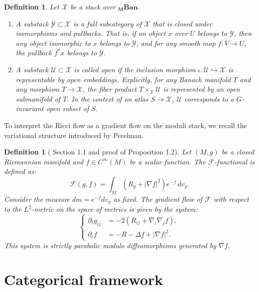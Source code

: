 \documentclass[11pt]{article}
\newtheorem{definition}[theorem]{Definition}
\begin{document}
\begin{definition}
Let $\mathcal{X}$ be a stack over $\mathbf{_M Ban}$.
\begin{enumerate}
    \item A substack $\mathcal{Y} \subset \mathcal{X}$ is a full subcategory of $\mathcal{X}$ that is closed under isomorphisms and pullbacks. That is, if an object $x$ over $U$ belongs to $\mathcal{Y}$, then any object isomorphic to $x$ belongs to $\mathcal{Y}$, and for any smooth map $f: V \to U$, the pullback $f^*x$ belongs to $\mathcal{Y}$.
    \item A substack $\mathcal{U} \subset \mathcal{X}$ is called open if the inclusion morphism $\iota: \mathcal{U} \hookrightarrow \mathcal{X}$ is representable by open embeddings. Explicitly, for any Banach manifold $T$ and any morphism $T \to \mathcal{X}$, the fiber product $T \times_{\mathcal{X}} \mathcal{U}$ is represented by an open submanifold of $T$. In the context of an atlas $S \to \mathcal{X}$, $\mathcal{U}$ corresponds to a $G$-invariant open subset of $S$.
\end{enumerate}
\end{definition}
To interpret the Ricci flow as a gradient flow on the moduli stack, we recall the variational structure introduced by Perelman.
\begin{definition}[\cite{Per02} Section 1.1 and proof of Proposition 1.2]
Let $(M,g)$ be a closed Riemannian manifold and $f \in C^\infty(M)$ be a scalar function. The $\mathcal{F}$-functional is defined as:
\[ \mathcal{F}(g, f) = \int_M (R_g + |\nabla f|^2) e^{-f} \, dv_g. \]
Consider the measure $dm = e^{-f} dv_g$ as fixed. The gradient flow of $\mathcal{F}$ with respect to the $L^2$-metric on the space of metrics is given by the system:
\begin{equation} \label{eq:perelman_flow}
\begin{cases}
\partial_t g_{ij} &= -2(R_{ij} + \nabla_i \nabla_j f), \\
\partial_t f &= -R - \Delta f + |\nabla f|^2.
\end{cases}
\end{equation}
This system is strictly parabolic modulo diffeomorphisms generated by $\nabla f$.
\end{definition}
\section{Categorical framework}
\end{document}
